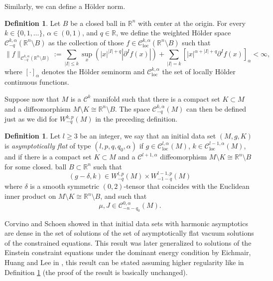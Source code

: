 \documentclass[12pt,a4paper]{amsart}
\theoremstyle{plain}
\theoremstyle{definition}
\newtheorem{definition}[theorem]{Definition}
\begin{document}
Similarly, we can define a Hölder norm.
\begin{definition}
    \noindent Let $B$ be a closed ball in $\mathbb{R}^n$ with center at the origin. For every $k \in \{0, 1, \dots \}$, $\alpha \in (0, 1)$, and $q \in \mathbb{R}$, we define the weighted Hölder space $\mathcal{C}^{k,\alpha}_{-q}(\mathbb{R}^n \setminus B)$ as the collection of those $f \in \mathcal{C}^{k,\alpha}_{\text{loc}}(\mathbb{R}^n \setminus B)$ such that
\[
\|f\|_{\mathcal{C}^{k,\alpha}_{-q}(\mathbb{R}^n \setminus B)} := \sum_{|I| \leq k} \sup_{x} \left( |x|^{|I|+q} |\partial^I f(x)| \right) + \sum_{|I| = k} \left[ |x|^{\alpha+|I|+q} \partial^I f(x) \right]_\alpha < \infty,
\]
where $[\cdot]_\alpha$ denotes the Hölder seminorm and $\mathcal{C}^{k,\alpha}_{\text{loc}} $ the set of locally Hölder continuous functions.
\end{definition}
Suppose now that $M$ is a $\mathcal{C}^k$ manifold such that there is a compact set $K \subset M$ and a diffeomorphism $M \setminus K \cong \mathbb{R}^n \setminus B$. The space $\mathcal{C}^{k,\alpha}_{-q}(M)$ can then be defined just as we did for $W^{k,p}_{-q}(M)$ in the preceding definition.
\begin{definition}\label{AFtype}
     Let $ l\geq 3$ be an integer, we say that an initial data set $(M, g, K)$ is \emph{asymptotically flat} of type $(l,p, q, q_0, \alpha)$ if $g \in \mathcal{C}^{l,\alpha}_{\text{loc}}(M)$, $k \in \mathcal{C}^{l-1,\alpha}_{\text{loc}}(M)$, and if there is a compact set $K \subset M$ and a $\mathcal{C}^{l+1,\alpha}$  diffeomorphism $M \setminus K \cong \mathbb{R}^n \setminus B$ for some closed. ball $B \subset \mathbb{R}^n$ such that
\[
(g - \delta, k) \in W^{l,p}_{-q}(M) \times W^{l-1,p}_{-1-q}(M)
\]
where $\delta$ is a smooth symmetric $(0,2)$-tensor that coincides with the Euclidean inner product on $M \setminus K \cong \mathbb{R}^n \setminus B$, and such that
\[
\mu, J \in \mathcal{C}^{0,\alpha}_{-n-q_0}(M).
\]
\end{definition}
Corvino and Schoen showed in  \cite[Theorem 1]{CorvinoSchoen} that initial data sets with harmonic asymptotics are dense in the set of solutions of the set of asymptotically flat  vacuum  solutions of the constrained equations. This result was later generalized to solutions of the Einstein constraint equations under the dominant energy condition by  Eichmair,  Huang and Lee in \cite[Theorem 18]{eichmair2015spacetime}, this result can be stated assuming higher regularity like in Definition \ref{AFtype} (the proof of the result is basically unchanged).
\end{document}
